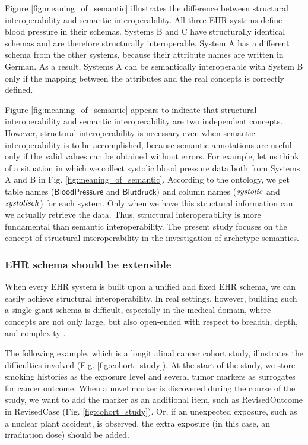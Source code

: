 \documentclass[preprint,3p,onecolumn,times,review]{article}
\begin{document}
Figure \ref{fig:meaning_of_semantic} illustrates the difference between structural interoperability and semantic interoperability.
All three EHR systems define blood pressure in their schemas.
Systems B and C have structurally identical schemas and are therefore structurally interoperable.
System A has a different schema from the other systems, because their attribute names are written in German.
As a result, Systems A can be semantically interoperable with System B only if the mapping between the attributes and the real concepts is correctly defined.

Figure {\ref{fig:meaning_of_semantic}} appears to indicate that structural interoperability and semantic interoperability are two independent concepts.
However, structural interoperability is necessary even when semantic interoperability is to be accomplished, because semantic annotations are useful only if the valid values can be obtained without errors. For example, let us think of a situation in which we collect systolic blood pressure data both from Systems A and B in Fig. {\ref{fig:meaning_of_semantic}}. According to the ontology, we get table names (${\mathsf{BloodPressure}}$ and ${\mathsf{Blutdruck}}$) and column names (${\it systolic}$ and ${\it systolisch}$) for each system. Only when we have this structural information can we actually retrieve the data.
Thus, structural interoperability is more fundamental than semantic interoperability.
The present study focuses on the concept of structural interoperability in the investigation of archetype semantics.

\subsubsection{EHR schema should be extensible}

When every EHR system is built upon a unified and fixed EHR schema, we can easily achieve structural interoperability.
In real settings, however, building such a single giant schema is difficult, especially in the medical domain, where concepts are not only large, but also open-ended with respect to breadth, depth, and complexity \cite{rector99:_clinic_termin,renner96:_data_inter}.

The following example, which is a longitudinal cancer cohort study, illustrates the difficulties involved (Fig. \ref{fig:cohort_study}). At the start of the study, we store smoking histories as the exposure level and several tumor markers as surrogates for cancer outcome.
When a novel marker is discovered during the course of the study, we want to add the marker as an additional item, such as {\sf RevisedOutcome} in {\sf RevisedCase} (Fig. \ref{fig:cohort_study}).
Or, if an unexpected exposure, such as a nuclear plant accident, is observed, the extra exposure (in this case, an irradiation dose) should be added.
\end{document}
